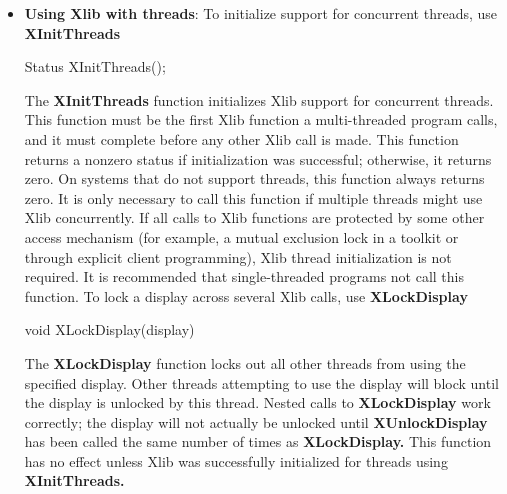 \documentclass{report}
\begin{document}
\begin{itemize}
            \bigbreak \noindent 
            \begin{cppcode}
            XLockDisplay(display)
            \end{cppcode}
            \bigbreak \noindent 
            While the display is locked, other threads in the same process that try to use the same Display * will block until it is unlocked.
            \bigbreak \noindent 
            \begin{cppcode}
            XUnlockDisplay(display)
            \end{cppcode}
        \item \textbf{Using Xlib with threads}: To initialize support for concurrent threads, use \textbf{XInitThreads}
            \bigbreak \noindent 
            \begin{cppcode}
                Status XInitThreads();
            \end{cppcode}
            \bigbreak \noindent 
            The \textbf{XInitThreads} function initializes Xlib support for concurrent threads. This function must be the first Xlib function a multi-threaded program calls, and it must complete before any other Xlib call is made. This function returns a nonzero status if initialization was successful; otherwise, it returns zero. On systems that do not support threads, this function always returns zero.
            \bigbreak \noindent 
            It is only necessary to call this function if multiple threads might use Xlib concurrently. If all calls to Xlib functions are protected by some other access mechanism (for example, a mutual exclusion lock in a toolkit or through explicit client programming), Xlib thread initialization is not required. It is recommended that single-threaded programs not call this function.
            \bigbreak \noindent 
            To lock a display across several Xlib calls, use \textbf{XLockDisplay}
            \bigbreak \noindent 
            \begin{cppcode}
            void XLockDisplay(display)
            \end{cppcode}
            \bigbreak \noindent 
            The \textbf{XLockDisplay} function locks out all other threads from using the specified display. Other threads attempting to use the display will block until the display is unlocked by this thread. Nested calls to \textbf{XLockDisplay} work correctly; the display will not actually be unlocked until \textbf{XUnlockDisplay} has been called the same number of times as \textbf{XLockDisplay.} This function has no effect unless Xlib was successfully initialized for threads using \textbf{XInitThreads.}

\end{itemize}
\end{document}
